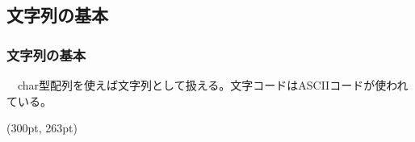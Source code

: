 \documentclass[dvipdfmx]{beamer}
\begin{document}
\subsection{文字列の基本}
\begin{frame}[t, fragile]
    \frametitle{文字列の基本}
    　char型配列を使えば文字列として扱える。文字コードはASCIIコードが使われている。
    \begin{textblock*}{0.3\linewidth}(300pt, 263pt)
        \space
    \end{textblock*}
\end{frame}
\end{document}
